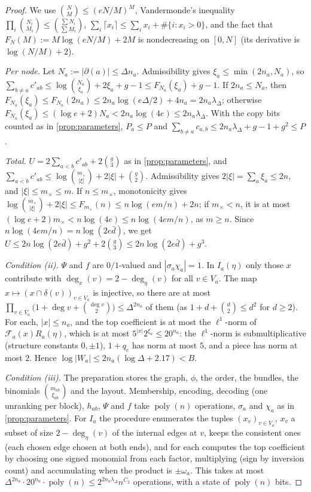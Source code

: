 \documentclass[11pt]{amsart}
\theoremstyle{plain}
\theoremstyle{definition}
\theoremstyle{remark}
\numberwithin{equation}{section}
\newcommand{\cF}{\mathcal{F}}
\newcommand{\mx}{m_{\times}}
\newcommand{\poly}{\operatorname{poly}}
\begin{document}
\begin{proof}
We use $\binom NM\le(eN/M)^M$, Vandermonde's inequality
$\prod_i\binom{N_i}{M_i}\le\binom{\sum N_i}{\sum M_i}$, $\sum_i\lceil x_i\rceil\le\sum_ix_i+\#\{i:x_i>0\}$,
and the fact that $F_N(M):=M\log(eN/M)+2M$ is nondecreasing on $[0,N]$ (its derivative is
$\log(N/M)+2$).

\emph{Per node.} Let $N_a:=|\partial(a)|\le\Delta n_a$. Admissibility gives $\xi_a\le\min(2n_a,N_a)$,
so $\sum_{b\ne a}c'_{ab}\le\log\binom{N_a}{\xi_a}+2\xi_a+g-1\le F_{N_a}(\xi_a)+g-1$. If $2n_a\le N_a$,
then $F_{N_a}(\xi_a)\le F_{N_a}(2n_a)\le2n_a\log(e\Delta/2)+4n_a=2n_a\lambda_\Delta$; otherwise
$F_{N_a}(\xi_a)\le(\log e+2)N_a<2n_a\log(4e)\le2n_a\lambda_\Delta$. With the copy bits counted as in
\cref{prop:parameters}, $P_a\le P$ and $\sum_{b\ne a}c_{a,b}\le2n_a\lambda_\Delta+g-1+g^2\le P$.

\emph{Total.} $U=2\sum_{a<b}c'_{ab}+2\binom g3$ as in \cref{prop:parameters}, and
$\sum_{a<b}c'_{ab}\le\log\binom{\mx}{|\xi|}+2|\xi|+\binom g2$. Admissibility gives
$2|\xi|=\sum_a\xi_a\le2n$, and $|\xi|\le\mx\le m$. If $n\le\mx$, monotonicity gives
$\log\binom{\mx}{|\xi|}+2|\xi|\le F_{\mx}(n)\le n\log(em/n)+2n$; if $\mx<n$, it is at most
$(\log e+2)\mx<n\log(4e)\le n\log(4em/n)$, as $m\ge n$. Since $n\log(4em/n)=n\log(2e\bar d)$, we get
$U\le2n\log(2e\bar d)+g^2+2\binom g3\le2n\log(2e\bar d)+g^3$.

\emph{Condition (ii).} $\Psi$ and $f$ are $0/1$-valued and $|\sigma_a\chi_a|=1$. In $I_a(\eta)$ only
those $x$ contribute with $\deg_x(v)=2-\deg_\eta(v)$ for all $v\in V_a$. The map
$x\mapsto(x\cap\delta(v))_{v\in V_a}$ is injective, so there are at most
$\prod_{v\in V_a}\bigl(1+\deg v+\binom{\deg v}2\bigr)\le\Delta^{2n_a}$ of them (as $1+d+\binom d2\le d^2$
for $d\ge2$). For each, $|x|\le n_a$, and the top coefficient is at most the $\ell^1$-norm of
$\cF_a(x)R_a(\eta)$, which is at most $5^{|x|}2^{\xi_a}\le20^{n_a}$: the $\ell^1$-norm is
submultiplicative (structure constants $0,\pm1$), $1+q_e$ has norm at most $5$, and a piece has norm
at most $2$. Hence $\log|W_a|\le2n_a(\log\Delta+2.17)<B$.

\emph{Condition (iii).} The preparation stores the graph, $\phi$, the order, the bundles, the
binomials $\binom{m_{ab}}{\xi_{ab}}$ and the layout. Membership, encoding, decoding (one unranking per
block), $h_{ab}$, $\Psi$ and $f$ take $\poly(n)$ operations, $\sigma_a$ and $\chi_a$ as in
\cref{prop:parameters}. For $I_a$ the procedure enumerates the tuples $(x_v)_{v\in V_a}$, $x_v$ a
subset of size $2-\deg_\eta(v)$ of the internal edges at $v$, keeps the consistent ones (each chosen
edge chosen at both ends), and for each computes the top coefficient by choosing one signed
monomial from each factor, multiplying (sign by inversion count) and accumulating when the product
is $\pm\omega_a$. This takes at most $\Delta^{2n_a}\cdot20^{n_a}\cdot\poly(n)\le
2^{2n_a\lambda_\Delta}n^{C_2}$ operations, with a state of $\poly(n)$ bits.
\end{proof}
\end{document}
